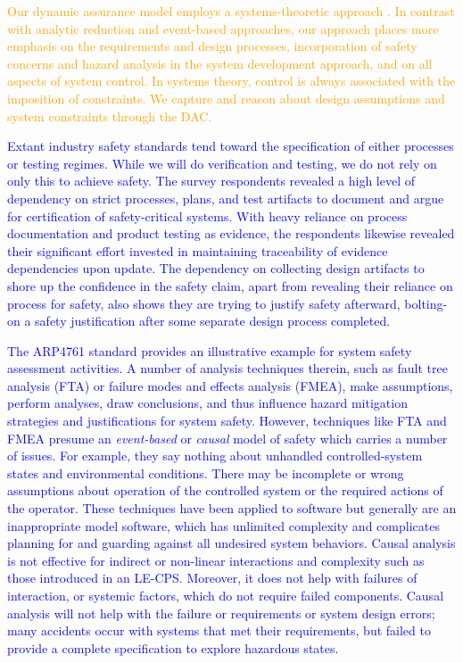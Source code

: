 \textcolor{orange}{
Our dynamic assurance model employs a systems-theoretic approach \cite{NL04}.  In contrast with analytic reduction and event-based approaches, our approach places more emphasis on the requirements and design processes, incorporation of safety concerns and hazard analysis in the system development approach, and on all aspects of system control.  In systems theory, control is always associated with the imposition of constraints.  We capture and reason about design assumptions and system constraints through the DAC. 
}

\textcolor{blue}{
Extant industry safety standards tend toward the specification of either processes or testing regimes. While we will do verification and testing, we do not rely on only this to achieve safety. The survey respondents revealed a high level of dependency on strict processes, plans, and test artifacts to document and argue for certification of safety-critical systems.  With heavy reliance on process documentation and product testing as evidence, the respondents likewise revealed their significant effort invested in maintaining traceability of evidence dependencies upon update. The dependency on collecting design artifacts to shore up the confidence in the safety claim, apart from revealing their reliance on process for safety, also shows they are trying to justify safety afterward, bolting-on a safety justification after some separate design process completed.
}

\textcolor{blue}{
The ARP4761 standard\cite{ARP4761} provides an illustrative example for system safety assessment activities. A number of analysis techniques therein, such as fault tree analysis (FTA) or failure modes and effects analysis (FMEA), make assumptions, perform analyses, draw conclusions, and thus influence hazard mitigation strategies and justifications for system safety.  However, techniques like FTA and FMEA presume an {\em event-based\/} or {\em causal\/} model of safety which carries a number of issues.  For example, they say nothing about unhandled controlled-system states and environmental conditions.  There may be incomplete or wrong assumptions about operation of the controlled system or the required actions of the operator.  These techniques have been applied to software but generally are an inappropriate model software, which has unlimited complexity and complicates planning for and guarding against all undesired system behaviors.  Causal analysis is not effective for indirect or non-linear interactions and complexity such as those introduced in an LE-CPS.  Moreover, it does not help with failures of interaction, or systemic factors, which do not require failed components.  Causal analysis will not help with the failure or requirements or system design errors; many accidents occur with systems that met their requirements, but failed to provide a complete specification to explore hazardous states.  
}

